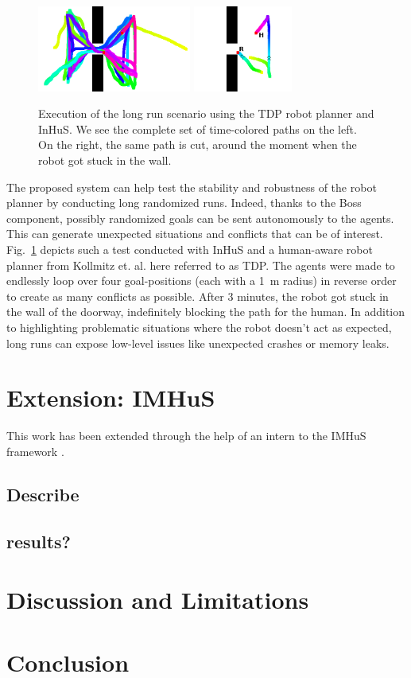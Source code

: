\begin{figure}
    \centering
    \includegraphics[height=80pt]{images/Chapter6/TDP_long_run_path.png}
    \includegraphics[height=80pt]{images/Chapter6/TDP_long_run_path_blocked_cropped_final.png}
    \caption{Execution of the long run scenario using the TDP robot planner and InHuS. We see the complete set of time-colored paths on the left. On the right, the same path is cut, around the moment when the robot got stuck in the wall. 
    }
    \label{fig:long_run_block}
    \vspace{-0.3cm}
\end{figure}

The proposed system can help test the stability and robustness of the robot planner by conducting long randomized runs. Indeed, thanks to the Boss component, possibly randomized goals can be sent autonomously to the agents. This can generate unexpected situations and conflicts that can be of interest.
Fig.~\ref{fig:long_run_block} depicts such a test conducted with InHuS and a human-aware robot planner from Kollmitz et. al. \cite{kollmitz_time_2015} here referred to as TDP. The agents were made to endlessly loop over four goal-positions (each with a \SI{1}{\metre} radius) in reverse order to create as many conflicts as possible. After 3 minutes, the robot got stuck in the wall of the doorway, indefinitely blocking the path for the human. In addition to highlighting problematic situations where the robot doesn't act as expected, long runs can expose low-level issues like unexpected crashes or memory leaks.


\section{Extension: IMHuS}

This work has been extended through the help of an intern to the IMHuS framework \cite{hauterville-2022}.

\subsection{Describe}
\subsection{results?}

\section{Discussion and Limitations}
\section{Conclusion}